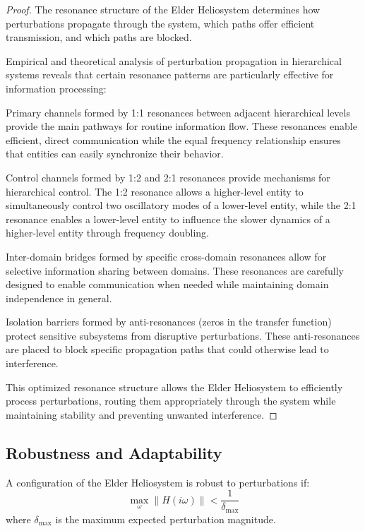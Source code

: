 \begin{proof}
The resonance structure of the Elder Heliosystem determines how perturbations propagate through the system, which paths offer efficient transmission, and which paths are blocked.

Empirical and theoretical analysis of perturbation propagation in hierarchical systems reveals that certain resonance patterns are particularly effective for information processing:

Primary channels formed by 1:1 resonances between adjacent hierarchical levels provide the main pathways for routine information flow. These resonances enable efficient, direct communication while the equal frequency relationship ensures that entities can easily synchronize their behavior.

Control channels formed by 1:2 and 2:1 resonances provide mechanisms for hierarchical control. The 1:2 resonance allows a higher-level entity to simultaneously control two oscillatory modes of a lower-level entity, while the 2:1 resonance enables a lower-level entity to influence the slower dynamics of a higher-level entity through frequency doubling.

Inter-domain bridges formed by specific cross-domain resonances allow for selective information sharing between domains. These resonances are carefully designed to enable communication when needed while maintaining domain independence in general.

Isolation barriers formed by anti-resonances (zeros in the transfer function) protect sensitive subsystems from disruptive perturbations. These anti-resonances are placed to block specific propagation paths that could otherwise lead to interference.

This optimized resonance structure allows the Elder Heliosystem to efficiently process perturbations, routing them appropriately through the system while maintaining stability and preventing unwanted interference.
\end{proof}

\subsection{Robustness and Adaptability}

\begin{theorem}
A configuration of the Elder Heliosystem is robust to perturbations if:
\begin{equation}
\max_{\omega} \| H(i\omega) \| < \frac{1}{\delta_{\text{max}}}
\end{equation}
where $\delta_{\text{max}}$ is the maximum expected perturbation magnitude.
\end{theorem}

